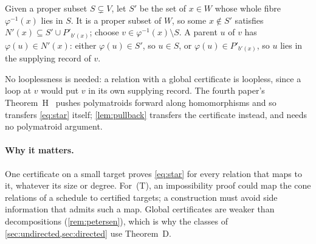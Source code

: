 \begin{outline}
Given a proper subset $S\subsetneq V$, let $S'$ be the set of $x\in W$ whose whole fibre $\varphi^{-1}(x)$ lies in $S$.
It is a proper subset of $W$, so some $x\notin S'$ satisfies $N'(x)\subseteq S'\cup P'_{b'(x)}$; choose
$v\in\varphi^{-1}(x)\setminus S$. A parent $u$ of $v$ has $\varphi(u)\in N'(x)$: either $\varphi(u)\in S'$, so $u\in S$,
or $\varphi(u)\in P'_{b'(x)}$, so $u$ lies in the supplying record of $v$.
\end{outline}

No looplessness is needed: a relation with a global certificate is loopless, since a loop at $v$ would put $v$ in its
own supplying record. The fourth paper's Theorem~H~\cite[Theorem~6.5]{FourthPaper2026} pushes polymatroids forward
along homomorphisms and so transfers \eqref{eq:star} itself; \cref{lem:pullback} transfers the certificate instead,
and needs no polymatroid argument.

\paragraph{Why it matters.} One certificate on a small target proves \eqref{eq:star} for every relation that maps to
it, whatever its size or degree. For~(T), an impossibility proof could map the cone relations of a schedule to certified
targets; a construction must avoid side information that admits such a map. Global certificates are weaker than
decompositions (\cref{rem:petersen}), which is why the classes of \cref{sec:undirected,sec:directed} use Theorem~D.
